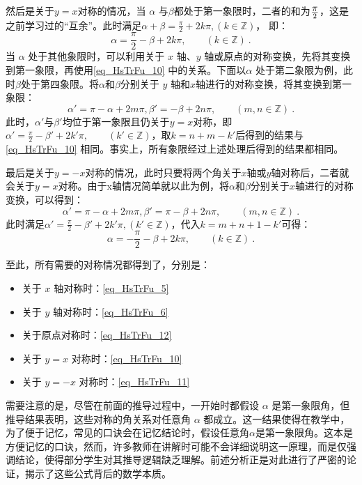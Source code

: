 然后是关于$y=x$对称的情况，当 $\alpha$ 与$\beta$都处于第一象限时，二者的和为$\displaystyle\pi \over2$，这是之前学习过的“互余”。此时满足$\displaystyle\alpha + \beta = \frac{\pi}{2} + 2k\pi, (k\in\mathbb{Z})$，
即：
\begin{equation}\label{eq_HsTrFu_10}
\alpha = \frac{\pi}{2} - \beta + 2k\pi, \qquad (k\in\mathbb{Z})~.
\end{equation}
当 $\alpha$ 处于其他象限时，可以利用关于 $x$ 轴、$y$ 轴或原点的对称变换，先将其变换到第一象限，再使用\autoref{eq_HsTrFu_10} 中的关系。下面以$\alpha$ 处于第二象限为例，此时$\beta$处于第四象限。将$\alpha$和$\beta$分别关于 $y$ 轴和$x$轴进行的对称变换，将其变换到第一象限：
\begin{equation}
\alpha' = \pi - \alpha+2m\pi,\beta' = - \beta+2n\pi,\qquad(m,n\in\mathbb{Z})~.
\end{equation}
此时，$\alpha'$与$\beta'$均位于第一象限且仍关于$y=x$对称，即
$\displaystyle\alpha'=\frac{\pi}{2} - \beta' + 2k'\pi, \qquad (k'\in\mathbb{Z})$，取$k=n+m-k'$后得到的结果与\autoref{eq_HsTrFu_10} 相同。事实上，所有象限经过上述处理后得到的结果都相同。

最后是关于$y=-x$对称的情况，此时只要将两个角关于$x$轴或$y$轴对称后，二者就会关于$y=x$对称。由于x轴情况简单就以此为例，将$\alpha$和$\beta$分别关于$x$轴进行的对称变换，可以得到：
\begin{equation}
\alpha' = \pi - \alpha+2m\pi,\beta' = \pi- \beta+2n\pi,\qquad(m,n\in\mathbb{Z})~.
\end{equation}
此时满足$\displaystyle\alpha'=\frac{\pi}{2} - \beta' + 2k'\pi,(k'\in\mathbb{Z})$，代入$k=m+n+1-k'$可得：
\begin{equation}\label{eq_HsTrFu_11}
\alpha = -\frac{\pi}{2} - \beta + 2k\pi, \qquad (k\in\mathbb{Z})~.
\end{equation}

至此，所有需要的对称情况都得到了，分别是：
\begin{itemize}
\item 关于 $x$ 轴对称时：\autoref{eq_HsTrFu_5}
\item 关于 $y$ 轴对称时：\autoref{eq_HsTrFu_6}
\item 关于原点对称时：\autoref{eq_HsTrFu_12}
\item 关于 $y = x$ 对称时：\autoref{eq_HsTrFu_10}
\item 关于 $y = -x$ 对称时：\autoref{eq_HsTrFu_11} 
\end{itemize}

需要注意的是，尽管在前面的推导过程中，一开始时都假设 $\alpha$ 是第一象限角，但推导结果表明，这些对称的角关系对任意角 $\alpha$ 都成立。这一结果使得在教学中，为了便于记忆，常见的口诀会在记忆结论时，假设任意角$\alpha$是第一象限角。这本是方便记忆的口诀，然而，许多教师在讲解时可能不会详细说明这一原理，而是仅强调结论，使得部分学生对其推导逻辑缺乏理解。前述分析正是对此进行了严密的论证，揭示了这些公式背后的数学本质。

